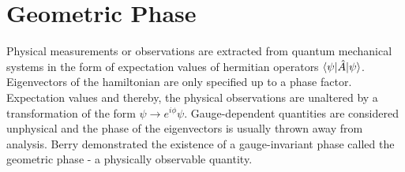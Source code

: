 %

\chapter{Geometric Phase}\label{ch:gp}
Physical measurements or observations are extracted from quantum mechanical systems in the form of expectation values of hermitian operators $\braket{\psi|\hat{A}|\psi}$.
Eigenvectors of the hamiltonian are only specified up to a phase factor. Expectation values and thereby, the physical observations are unaltered by a transformation of the form 
$\psi \rightarrow e^{i \phi} \psi$. Gauge-dependent quantities are considered unphysical and the phase of the eigenvectors is usually thrown away from analysis. Berry
demonstrated the existence of a gauge-invariant phase called the geometric phase - a physically observable quantity.

